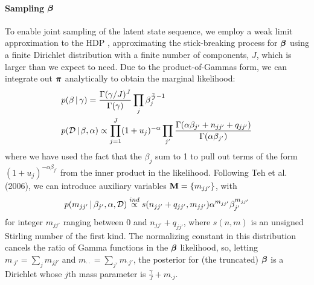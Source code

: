 
\paragraph{Sampling \texorpdfstring{$\boldsymbol{\beta}$}{beta}}
\label{sec:sampling-bbeta}
To enable joint sampling of the latent state sequence, we employ a
weak limit approximation to the HDP \cite{johnson2013bayesian}, approximating the stick-breaking
process for $\boldsymbol{\beta}$ using a finite Dirichlet distribution with a
finite number of components, $J$, which is larger than we expect to
need.  Due to the product-of-Gammas form, we can integrate out $\boldsymbol{\pi}$ 
analytically to obtain the marginal likelihood:
\begin{align}
\begin{split}
\label{eq:beta-prior-likelihood}
  &p(\beta \, \vert \, \gamma) = \frac{\Gamma(\gamma /
    J)^J}{\Gamma(\gamma)} \prod_{j} \beta_{j}^{\frac{\gamma}{J} - 1} \\
  &p(\mathcal{D} \, \vert \, \beta, \alpha) \propto
  \prod_{j=1}^J (1+u_j)^{-\alpha} \prod_{j'}
    \frac{\Gamma(\alpha\beta_{j'} + n_{jj'} +
    q_{jj'})}{\Gamma(\alpha\beta_{j'})} 
\end{split}
\end{align}
 where we have used the fact that the $\beta_j$ sum to 1 to pull out
 terms of the form $(1 + u_j)^{-\alpha\beta_{j'}}$ from the inner
 product in the likelihood.  Following Teh et al. (2006), 
we can introduce auxiliary variables $\mathbf{M} = \{m_{jj'}\}$, with
\begin{equation}
  \label{eq:m-distribution}
  p(m_{jj'} \, \vert \, \beta_{j'}, \alpha, \mathcal{D}) \stackrel{ind}{\propto}
  s(n_{jj'} + q_{jj'}, m_{jj'}) \alpha^{m_{jj'}}
    \beta_{j'}^{m_{jj'}}
\end{equation}
for integer $m_{jj'}$ ranging between $0$ and $n_{jj'} + q_{jj'}$,
where $s(n,m)$ is an unsigned Stirling number of the first kind.
The normalizing constant in this distribution cancels the ratio of
Gamma functions in the $\boldsymbol{\beta}$ likelihood, so, letting $m_{\cdot j'} =
\sum_{j} m_{jj'}$ and $m_{\cdot\cdot} = \sum_{j'} m_{\cdot j'}$, 
the posterior for (the truncated) $\boldsymbol{\beta}$ is a Dirichlet
whose $j$th mass parameter is $\frac{\gamma}{J} + m_{\cdot j}$.

